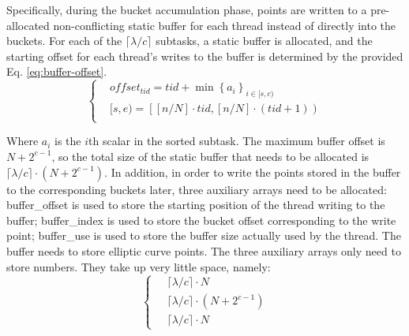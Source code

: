 \documentclass[journal=tches,final]{iacrtrans}
\begin{document}
Specifically, during the bucket accumulation phase, points are written to a pre-allocated non-conflicting static buffer for each thread instead of directly into the buckets. For each of the $\lceil\lambda/ c \rceil$ subtasks, a static buffer is allocated, and the starting offset for each thread's writes to the buffer is determined by the provided Eq. \ref{eq:buffer-offset}.
\
\begin{equation}
    \label{eq:buffer-offset}
    \left\{\begin{aligned} {{{}}} & {{} {{} {{} o f f s e t_{t i d}=t i d+\operatorname* {m i n} \left\{a_{i} \right\}_{i \in[ s, c )}}}} \\ {{{}}} & {{} {{} {{} [ s, e )=\left[ \left[ n / N \right] \cdot t i d, \left[ n / N \right] \cdot( t i d+1 ) \right)}}} \\ \end{aligned} \right. 
\end{equation}

Where $a_{i}$ is the $i$th scalar in the sorted subtask. The maximum buffer offset is $N+2^{c-1}$, so the total size of the static buffer that needs to be allocated is $\lceil\lambda/ c \rceil\cdot( N+2^{c-1} )$. In addition, in order to write the points stored in the buffer to the corresponding buckets later, three auxiliary arrays need to be allocated: buffer\_offset is used to store the starting position of the thread writing to the buffer; buffer\_index is used to store the bucket offset corresponding to the write point; buffer\_use is used to store the buffer size actually used by the thread. The buffer needs to store elliptic curve points. The three auxiliary arrays only need to store numbers. They take up very little space, namely: 
\begin{equation} \left\{ 
    \begin{aligned} 
        \ & \lceil \lambda / c \rceil \cdot N \\ \ & \lceil \lambda / c \rceil \cdot (N + 2^{c-1}) \\ \ & \lceil \lambda / c \rceil \cdot N 
    \end{aligned} \right. 
\end{equation}
\end{document}
